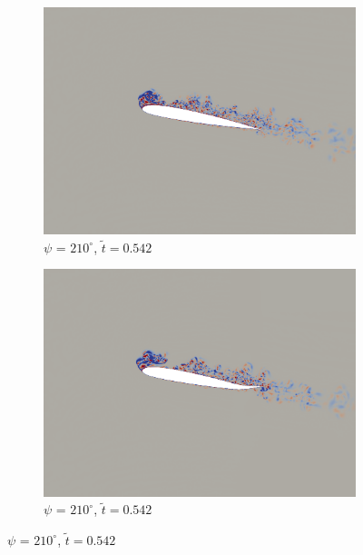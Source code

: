 \begin{figure}[H]
	\begin{subfigure}[b]{0.4\textwidth}
		\centering
		\includegraphics[width=1\textwidth]{figures/SC1095/baseline/phase_210.png}
		\caption{ $\psi$ = $210^\circ$, $\tilde{t}=0.542$}
		\label{fig:SC1095_baseline_psi210}
	\end{subfigure}
	\begin{subfigure}[b]{0.4\textwidth}
		\centering
		\includegraphics[width=1\textwidth]{figures/SC1095/AC/phase_210.png}
		\caption{ $\psi$ = $210^\circ$, $\tilde{t}=0.542$}
		\label{fig:SC1095_AC_psi210}
	\end{subfigure}
	

\end{figure}
